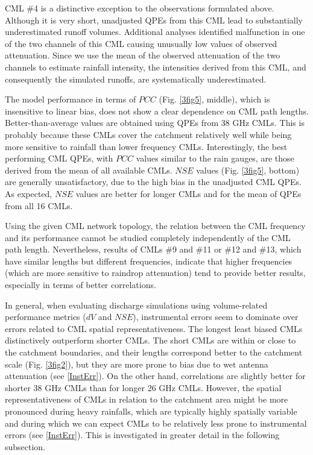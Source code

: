 \documentclass{ctuthesis}\usepackage[]{graphicx}\usepackage[]{color}
\begin{document}
CML \#4 is a distinctive exception to the observations formulated above. Although it is very short, unadjusted QPEs from this CML lead to substantially underestimated runoff volumes. Additional analyses identified malfunction in one of the two channels of this CML causing unusually low values of observed attenuation. Since we use the mean of the observed attenuation of the two channels to estimate rainfall intensity, the intensities derived from this CML, and consequently the simulated runoffs, are systematically underestimated.

The model performance in terms of $PCC$ (Fig. \ref{3fig5}, middle), which is insensitive to linear bias, does not show a clear dependence on CML path lengths. Better-than-average values are obtained using QPEs from 38 GHz CMLs. This is probably because these CMLs cover the catchment relatively well while being more sensitive to rainfall than lower frequency CMLs. Interestingly, the best performing CML QPEs, with $PCC$ values similar to the rain gauges, are those derived from the mean of all available CMLs. $NSE$ values (Fig. \ref{3fig5}, bottom) are generally unsatisfactory, due to the high bias in the unadjusted CML QPEs. As expected, $NSE$ values are better for longer CMLs and for the mean of QPEs from all 16 CMLs.
 
Using the given CML network topology, the relation between the CML frequency and its performance cannot be studied completely independently of the CML path length. Nevertheless, results of CMLs \#9 and \#11 or \#12 and \#13, which have similar lengths but different frequencies, indicate that higher frequencies (which are more sensitive to raindrop attenuation) tend to provide better results, especially in terms of better correlations.
 
In general, when evaluating discharge simulations using volume-related performance metrics ($dV$ and $NSE$), instrumental errors seem to dominate over errors related to CML spatial representativeness. The longest least biased CMLs distinctively outperform shorter CMLs. The short CMLs are within or close to the catchment boundaries, and their lengths correspond better to the catchment scale (Fig. \ref{3fig2}), but they are more prone to bias due to wet antenna attenuation (see \ref{InstErr}). On the other hand, correlations are slightly better for shorter 38 GHz CMLs than for longer 26 GHz CMLs. However, the spatial representativeness of CMLs in relation to the catchment area might be more pronounced during heavy rainfalls, which are typically highly spatially variable and during which we can expect CMLs to be relatively less prone to instrumental errors (see \ref{InstErr}). This is investigated in greater detail in the following subsection.
\end{document}
